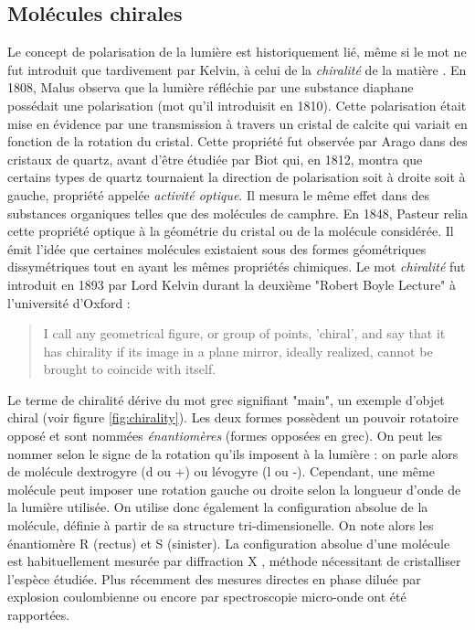\subsection{Molécules chirales}
Le concept de polarisation de la lumière est historiquement lié, même si le mot ne fut introduit que tardivement par Kelvin, à celui de la \textit{chiralité} de la matière . En 1808, Malus observa que la lumière réfléchie par une substance diaphane possédait une polarisation (mot qu'il introduisit en 1810). Cette polarisation était mise en évidence par une transmission à travers un cristal de calcite qui variait en fonction de la rotation du cristal. Cette propriété fut observée par Arago dans des cristaux de quartz, avant d'être étudiée par Biot qui, en 1812, montra que certains types de quartz tournaient la direction de polarisation soit à droite soit à gauche, propriété appelée \textit{activité optique}. Il mesura le même effet dans des substances organiques telles que des molécules de camphre. En 1848, Pasteur relia cette propriété optique à la géométrie du cristal ou de la molécule considérée. Il émit l'idée que certaines molécules existaient sous des formes géométriques dissymétriques tout en ayant les mêmes propriétés chimiques. Le mot \textit{chiralité} fut introduit en 1893 par Lord Kelvin durant la deuxième "Robert Boyle Lecture" à l'université d'Oxford  :
\begin{quotation}
I call any geometrical figure, or group of points, 'chiral', and say that it has chirality if its image in a plane mirror, ideally realized, cannot be brought to coincide with itself.
\end{quotation}
Le terme de chiralité dérive du mot grec signifiant "main", un exemple d'objet chiral (voir figure \ref{fig:chirality}). Les deux formes possèdent un pouvoir rotatoire opposé et sont nommées \textit{énantiomères} (formes opposées en grec). On peut les nommer selon le signe de la rotation qu'ils imposent à la lumière : on parle alors de molécule dextrogyre (d ou +) ou lévogyre (l ou -). Cependant, une même molécule peut imposer une rotation gauche ou droite selon la longueur d'onde de la lumière utilisée. On utilise donc également la configuration absolue de la molécule, définie à partir de sa structure tri-dimensionelle. On note alors les énantiomère R (rectus) et S (sinister). La configuration absolue d'une molécule est habituellement mesurée par diffraction X , méthode nécessitant de cristalliser l'espèce étudiée. Plus récemment des mesures directes en phase diluée par explosion coulombienne  ou encore par spectroscopie micro-onde  ont été rapportées.

